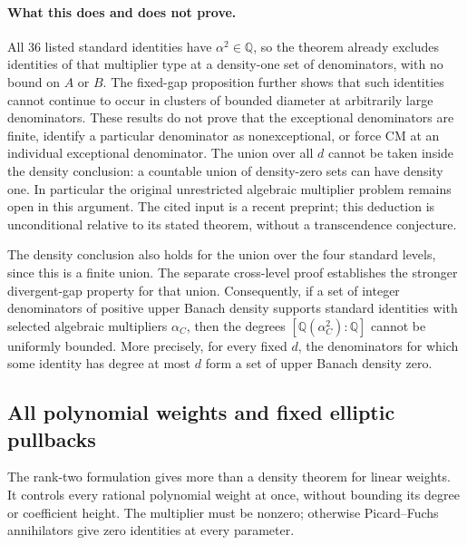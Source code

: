 \paragraph{What this does and does not prove.}
All 36 listed standard identities have $\alpha^2\in\mathbb Q$,
so the theorem already excludes identities of that multiplier type
at a density-one set of denominators, with no bound on $A$ or $B$.
The fixed-gap proposition further shows that such identities
cannot continue to occur in clusters of bounded diameter at
arbitrarily large denominators.  These results do not prove that
the exceptional denominators are finite, identify a particular
denominator as nonexceptional, or force CM at an individual
exceptional denominator.
The union over all $d$ cannot be taken inside the density
conclusion: a countable union of density-zero sets can have density
one.  In particular the original unrestricted algebraic multiplier
problem remains open in this argument.  The cited input is a
recent preprint; this deduction is unconditional relative to its
stated theorem, without a transcendence conjecture.

The density conclusion also holds for the union over the four
standard levels, since this is a finite union.  The separate
cross-level proof establishes the stronger divergent-gap property
for that union.  Consequently, if a set of integer
denominators of positive upper Banach density supports standard
identities with selected algebraic multipliers $\alpha_C$, then
the degrees $[\mathbb Q(\alpha_C^2):\mathbb Q]$ cannot be
uniformly bounded.  More precisely, for every fixed $d$, the
denominators for which some identity has degree at most $d$ form
a set of upper Banach density zero.

\subsection{All polynomial weights and fixed elliptic pullbacks}
\label{sec:C-polynomial-density}

The rank-two formulation gives more than a density theorem for linear
weights. It controls every rational polynomial weight at once, without
bounding its degree or coefficient height. The multiplier must be
nonzero; otherwise Picard--Fuchs annihilators give zero identities at
every parameter.

